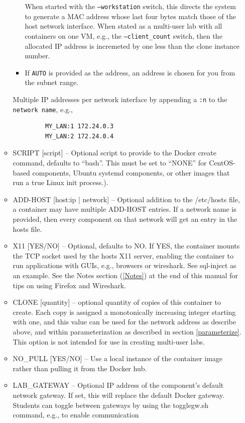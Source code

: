 \documentclass[12pt]{article}
\begin{document}
\begin{itemize}
\begin{itemize}
\begin{itemize}
When started with the {\tt --workstation} switch, this directs the system to generate a MAC address whose last four bytes match 
those of the host network interface.  When stated as a multi-user lab with all containers on one VM, e.g., the 
{\tt --client\_count} switch, then the allocated IP address is incremeted by one less than the clone instance number.
\item If {\tt AUTO} is provided as the address, an address is chosen for you from the subnet range.  
\end{itemize}
Multiple IP addresses per network interface by appending a {\tt :n} to the {\tt network name}, e.g., 
\begin{verbatim}
         MY_LAN:1 172.24.0.3
         MY_LAN:2 172.24.0.4
\end{verbatim}
\item SCRIPT [script] -- Optional script to provide to the Docker create command, defaults to ``bash''.  This must be set to
``NONE'' for CentOS-based components, Ubuntu systemd components, or other images that run a true Linux init process.).
\item ADD-HOST [host:ip | network] -- Optional addition to the /etc/hosts file, a container may have multiple ADD-HOST entries.
If a network name is provided, then every component on that network will get an entry in the hosts file.
\item X11 [YES/NO] -- Optional, defaults to NO.  If YES, the container mounts the TCP socket used by the hosts X11 server,
enabling the container to run applications with GUIs, e.g., browsers or wireshark.  See sql-inject as an example.  See the
Notes section (\ref{Notes}) at the end of this manual for tips on using Firefox and Wireshark.
\item CLONE [quantity] -- optional quantity of copies of this container to create. Each copy is assigned a monotonically
increasing integer starting with one, and this value can be used for the network address as describe above, and within
parameterization as described in section \ref{parameterize}. This option is not intended for use in creating multi-user
labs.
\item NO\_PULL [YES/NO] -- Use a local instance of the container image rather than pulling it from the Docker hub.
\item LAB\_GATEWAY -- Optional IP address of the component's default network gateway.   If set, this will replace the
default Docker gateway.  Students can toggle between gateways by using the togglegw.sh command, e.g., to enable communication

\end{itemize}
\end{itemize}
\end{document}
